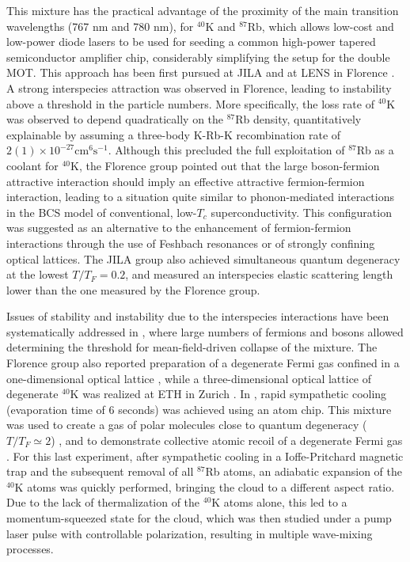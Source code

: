 \documentclass[pra,letterpaper,twocolumn,showpacs,superscriptaddress]{revtex4}
\begin{document}
This mixture has the practical advantage of the proximity of the main transition wavelengths (767 nm and 780 nm),  
for ${}^{40}$K and ${}^{87}$Rb, which allows low-cost and low-power diode lasers to be used for seeding a common 
high-power tapered semiconductor amplifier chip, considerably simplifying the setup for the double MOT. 
This approach has been first pursued at JILA \cite{Goldwin2001,Goldwin2004} and at LENS in Florence 
\cite{Modugno2001,Modugno2002,Roati2002}. 
A strong interspecies attraction was observed in Florence, leading to instability above a threshold in the particle numbers. 
More specifically, the loss rate of ${}^{40}$K was observed to depend quadratically on the ${}^{87}$Rb density, quantitatively 
explainable by assuming a three-body K-Rb-K recombination rate of $2(1) \times 10^{-27} \mathrm{cm^6 s^{-1}}$.
Although this precluded the full exploitation of ${}^{87}$Rb as a coolant for ${}^{40}$K, the Florence group pointed 
out that the large boson-fermion attractive interaction should imply an effective attractive fermion-fermion interaction, leading 
to a situation quite similar to phonon-mediated interactions in the BCS model of conventional, low-$T_c$ superconductivity.
This configuration was suggested as an alternative to the enhancement of fermion-fermion interactions through the use of Feshbach 
resonances or of strongly confining optical lattices. The JILA group also achieved simultaneous quantum degeneracy at the 
lowest $T/T_F=0.2$,  and measured an interspecies elastic scattering length lower than the one measured by the Florence group. 

Issues of stability and instability due to the interspecies interactions have been systematically addressed in \cite{Ospelkaus2006}, 
where large numbers of fermions and bosons allowed determining the threshold for mean-field-driven collapse of the mixture.
The Florence group also reported preparation of a degenerate Fermi gas confined in a one-dimensional optical lattice 
\cite{Modugno2003}, while a three-dimensional optical lattice of degenerate ${}^{40}$K was realized at ETH in Zurich \cite{Kohl2005}. 
In \cite{Aubin2006}, rapid sympathetic cooling (evaporation time of 6 seconds) was achieved using an atom chip.
This mixture was used to create a gas of polar molecules close to quantum degeneracy ($T/T_F \simeq 2$)   \cite{Ni2008},  
and to demonstrate collective atomic recoil of a degenerate Fermi gas \cite{Wang2011}. For this last experiment, after sympathetic cooling in a 
Ioffe-Pritchard magnetic trap and the subsequent removal of all ${}^{87}$Rb atoms, an adiabatic expansion of the ${}^{40}$K atoms was quickly 
performed, bringing the cloud to a different aspect ratio. Due to the lack of thermalization of the ${}^{40}$K atoms alone, this led to a 
momentum-squeezed state for the cloud, which was then studied under a pump laser pulse with controllable polarization, resulting in multiple wave-mixing processes. 
\end{document}
